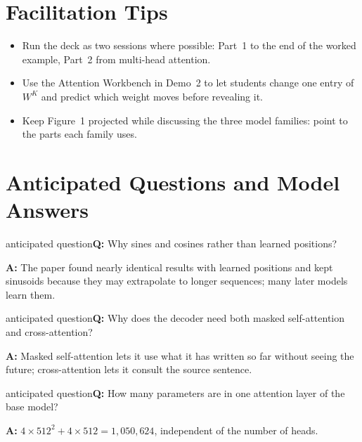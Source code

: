 \documentclass[11pt]{article}
\begin{document}
\section{Facilitation Tips}\begin{itemize}\item Run the deck as two sessions where possible: Part~1 to the end of the worked example, Part~2 from multi-head attention.\item Use the Attention Workbench in Demo~2 to let students change one entry of $W^K$ and predict which weight moves before revealing it.\item Keep Figure~1 projected while discussing the three model families: point to the parts each family uses.\end{itemize}

\section{Anticipated Questions and Model Answers}

\begin{question}{anticipated question}\textbf{Q:} Why sines and cosines rather than learned positions?\par\smallskip\textbf{A:} The paper found nearly identical results with learned positions and kept sinusoids because they may extrapolate to longer sequences; many later models learn them.\end{question}

\begin{question}{anticipated question}\textbf{Q:} Why does the decoder need both masked self-attention and cross-attention?\par\smallskip\textbf{A:} Masked self-attention lets it use what it has written so far without seeing the future; cross-attention lets it consult the source sentence.\end{question}

\begin{question}{anticipated question}\textbf{Q:} How many parameters are in one attention layer of the base model?\par\smallskip\textbf{A:} $4\times512^2+4\times512=1{,}050{,}624$, independent of the number of heads.\end{question}
\end{document}
